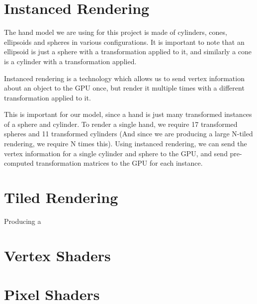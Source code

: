 \section{Instanced Rendering}

The hand model we are using for this project is made of cylinders, cones, ellipsoids
and spheres in various configurations.  It is important to note that an
ellipsoid is just a sphere with a transformation applied to it, and similarly a
cone is a cylinder with a transformation applied.

Instanced rendering is a technology which allows us to send vertex information
about an object to the GPU once, but render it multiple times with a different
transformation applied to it.

This is important for our model, since a hand is just many transformed instances of a sphere
and cylinder.  To render a single hand, we require 17 transformed
spheres and 11 transformed cylinders (And since we are producing a large N-tiled
rendering, we require N times this).  Using instanced rendering, we can send the
vertex information for a single cylinder and sphere to the GPU, and send
pre-computed transformation matrices to the GPU for each instance.

\section{Tiled Rendering}

Producing a 

\section{Vertex Shaders}

\section{Pixel Shaders}

